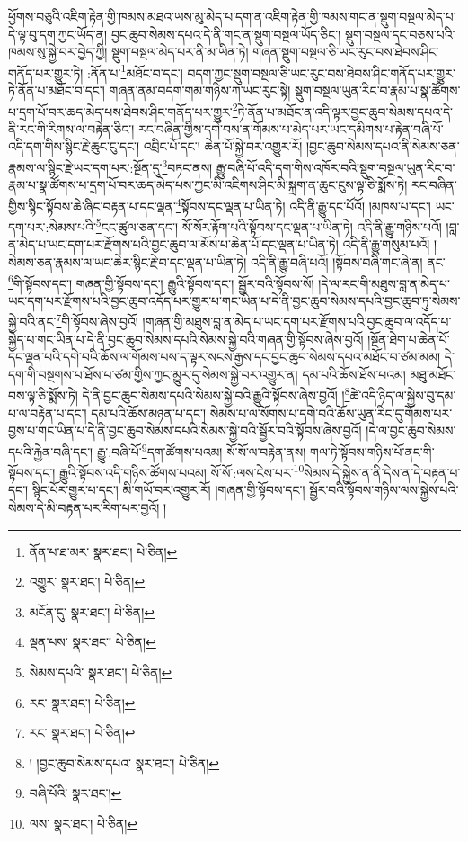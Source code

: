 ཕྱོགས་བཅུའི་འཇིག་རྟེན་གྱི་ཁམས་མཐའ་ཡས་མུ་མེད་པ་དག་ན་འཇིག་རྟེན་གྱི་ཁམས་གང་ན་སྡུག་བསྔལ་མེད་པ་དེ་ལྟ་བུ་དག་ཀྱང་ཡོད་ན། བྱང་ཆུབ་སེམས་དཔའ་དེ་ནི་གང་ན་སྡུག་བསྔལ་ཡོད་ཅིང་། སྡུག་བསྔལ་དང་བཅས་པའི་ཁམས་སུ་སྐྱེ་བར་བྱེད་ཀྱི། སྡུག་བསྔལ་མེད་པར་ནི་མ་ཡིན་ཏེ། གཞན་སྡུག་བསྔལ་ཅི་ཡང་རུང་བས་ཐེབས་ཤིང་གནོད་པར་གྱུར་ཏེ། :ནོན་པ་\footnote{ནོན་པ་ཐ་མར་  སྣར་ཐང་།  པེ་ཅིན། }མཐོང་བ་དང་། བདག་ཀྱང་སྡུག་བསྔལ་ཅི་ཡང་རུང་བས་ཐེབས་ཤིང་གནོད་པར་གྱུར་ཏེ་ནོན་པ་མཐོང་བ་དང་། གཞན་ནམ་བདག་གམ་གཉིས་ཀ་ཡང་རུང་སྟེ། སྡུག་བསྔལ་ཡུན་རིང་བ་རྣམ་པ་སྣ་ཚོགས་པ་དྲག་པོ་བར་ཆད་མེད་པས་ཐེབས་ཤིང་གནོད་པར་གྱུར་\footnote{འགྱུར་  སྣར་ཐང་།  པེ་ཅིན། }ཏེ་ནོན་པ་མཐོང་ན་འདི་ལྟར་བྱང་ཆུབ་སེམས་དཔའ་དེ་ནི་རང་གི་རིགས་ལ་བརྟེན་ཅིང་། རང་བཞིན་གྱིས་དགེ་བས་ན་གོམས་པ་མེད་པར་ཡང་དམིགས་པ་རྟེན་བཞི་པོ་འདི་དག་གིས་སྙིང་རྗེ་ཆུང་ངུ་དང་། འབྲིང་པོ་དང་། ཆེན་པོ་སྐྱེ་བར་འགྱུར་རོ། །བྱང་ཆུབ་སེམས་དཔའ་ནི་སེམས་ཅན་རྣམས་ལ་སྙིང་རྗེ་ཡང་དག་པར་:སྔོན་དུ་\footnote{མངོན་དུ་  སྣར་ཐང་།  པེ་ཅིན། }བཏང་ནས། རྒྱུ་བཞི་པོ་འདི་དག་གིས་འཁོར་བའི་སྡུག་བསྔལ་ཡུན་རིང་བ་རྣམ་པ་སྣ་ཚོགས་པ་དྲག་པོ་བར་ཆད་མེད་པས་ཀྱང་མི་འཇིགས་ཤིང་མི་སྐྲག་ན་ཆུང་ངུས་ལྟ་ཅི་སྨོས་ཏེ། རང་བཞིན་གྱིས་སྙིང་སྟོབས་ཆེ་ཞིང་བརྟན་པ་དང་ལྡན་\footnote{ལྡན་པས་  སྣར་ཐང་།  པེ་ཅིན། }སྟོབས་དང་ལྡན་པ་ཡིན་ཏེ། འདི་ནི་རྒྱུ་དང་པོའོ། །མཁས་པ་དང་། ཡང་དག་པར་:སེམས་པའི་\footnote{སེམས་དཔའི་  སྣར་ཐང་།  པེ་ཅིན། }ངང་ཚུལ་ཅན་དང་། སོ་སོར་རྟོག་པའི་སྟོབས་དང་ལྡན་པ་ཡིན་ཏེ། འདི་ནི་རྒྱུ་གཉིས་པའོ། །བླ་ན་མེད་པ་ཡང་དག་པར་རྫོགས་པའི་བྱང་ཆུབ་ལ་མོས་པ་ཆེན་པོ་དང་ལྡན་པ་ཡིན་ཏེ། འདི་ནི་རྒྱུ་གསུམ་པའོ། །སེམས་ཅན་རྣམས་ལ་ཡང་ཆེར་སྙིང་རྗེ་བ་དང་ལྡན་པ་ཡིན་ཏེ། འདི་ནི་རྒྱུ་བཞི་པའོ། །སྟོབས་བཞི་གང་ཞེ་ན། ནང་\footnote{རང་  སྣར་ཐང་།  པེ་ཅིན། }གི་སྟོབས་དང་། གཞན་གྱི་སྟོབས་དང་། རྒྱུའི་སྟོབས་དང་། སྦྱོར་བའི་སྟོབས་སོ། །དེ་ལ་རང་གི་མཐུས་བླ་ན་མེད་པ་ཡང་དག་པར་རྫོགས་པའི་བྱང་ཆུབ་འདོད་པར་གྱུར་པ་གང་ཡིན་པ་དེ་ནི་བྱང་ཆུབ་སེམས་དཔའི་བྱང་ཆུབ་ཏུ་སེམས་སྐྱེ་བའི་ནང་\footnote{རང་  སྣར་ཐང་།  པེ་ཅིན། }གི་སྟོབས་ཞེས་བྱའོ། །གཞན་གྱི་མཐུས་བླ་ན་མེད་པ་ཡང་དག་པར་རྫོགས་པའི་བྱང་ཆུབ་ལ་འདོད་པ་སྐྱེད་པ་གང་ཡིན་པ་དེ་ནི་བྱང་ཆུབ་སེམས་དཔའི་སེམས་སྐྱེ་བའི་གཞན་གྱི་སྟོབས་ཞེས་བྱའོ། །སྔོན་ཐེག་པ་ཆེན་པོ་དང་ལྡན་པའི་དགེ་བའི་ཆོས་ལ་གོམས་པས་ད་ལྟར་སངས་རྒྱས་དང་བྱང་ཆུབ་སེམས་དཔའ་མཐོང་བ་ཙམ་མམ། དེ་དག་གི་བསྔགས་པ་ཐོས་པ་ཙམ་གྱིས་ཀྱང་མྱུར་དུ་སེམས་སྐྱེ་བར་འགྱུར་ན། དམ་པའི་ཆོས་ཐོས་པའམ། མཐུ་མཐོང་བས་ལྟ་ཅི་སྨོས་ཏེ། དེ་ནི་བྱང་ཆུབ་སེམས་དཔའི་སེམས་སྐྱེ་བའི་རྒྱུའི་སྟོབས་ཞེས་བྱའོ། །\footnote{། །བྱང་ཆུབ་སེམས་དཔའ་  སྣར་ཐང་།  པེ་ཅིན། }ཚེ་འདི་ཉིད་ལ་སྐྱེས་བུ་དམ་པ་ལ་བརྟེན་པ་དང་། དམ་པའི་ཆོས་མཉན་པ་དང་། སེམས་པ་ལ་སོགས་པ་དགེ་བའི་ཆོས་ཡུན་རིང་དུ་གོམས་པར་བྱས་པ་གང་ཡིན་པ་དེ་ནི་བྱང་ཆུབ་སེམས་དཔའི་སེམས་སྐྱེ་བའི་སྦྱོར་བའི་སྟོབས་ཞེས་བྱའོ། །དེ་ལ་བྱང་ཆུབ་སེམས་དཔའི་རྐྱེན་བཞི་དང་། རྒྱུ་:བཞི་པོ་\footnote{བཞི་པོའི་  སྣར་ཐང་། }དག་ཚོགས་པའམ། སོ་སོ་ལ་བརྟེན་ནས། གལ་ཏེ་སྟོབས་གཉིས་པོ་ནང་གི་སྟོབས་དང་། རྒྱུའི་སྟོབས་འདི་གཉིས་ཚོགས་པའམ། སོ་སོ་:ལས་ངེས་པར་\footnote{ལས་  སྣར་ཐང་།  པེ་ཅིན། }སེམས་དེ་སྐྱེས་ན་ནི་དེས་ན་དེ་བརྟན་པ་དང་། སྙིང་པོར་གྱུར་པ་དང་། མི་གཡོ་བར་འགྱུར་རོ། །གཞན་གྱི་སྟོབས་དང་། སྦྱོར་བའི་སྟོབས་གཉིས་ལས་སྐྱེས་པའི་སེམས་དེ་མི་བརྟན་པར་རིག་པར་བྱའོ། །

